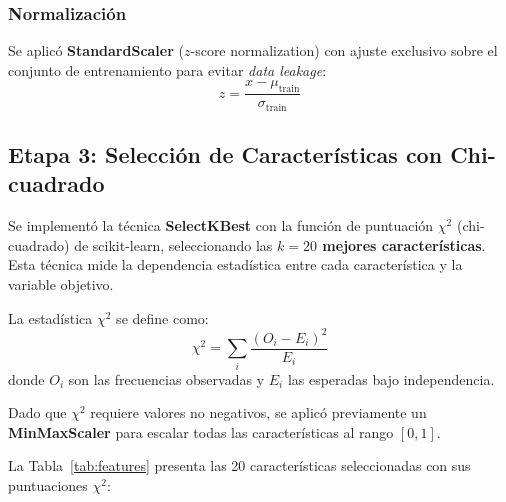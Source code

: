 \documentclass[12pt,a4paper]{article}
\begin{document}
\subsubsection{Normalización}
Se aplicó \textbf{StandardScaler} ($z$-score normalization) con ajuste exclusivo sobre el
conjunto de entrenamiento para evitar \textit{data leakage}:
\begin{equation}
    z = \frac{x - \mu_{\text{train}}}{\sigma_{\text{train}}}
\end{equation}

\subsection{Etapa 3: Selección de Características con Chi-cuadrado}

Se implementó la técnica \textbf{SelectKBest} con la función de puntuación $\chi^2$
(chi-cuadrado) de scikit-learn, seleccionando las \textbf{$k=20$ mejores características}.
Esta técnica mide la dependencia estadística entre cada característica y la variable objetivo.

La estadística $\chi^2$ se define como:
\begin{equation}
    \chi^2 = \sum_{i} \frac{(O_i - E_i)^2}{E_i}
\end{equation}
donde $O_i$ son las frecuencias observadas y $E_i$ las esperadas bajo independencia.

Dado que $\chi^2$ requiere valores no negativos, se aplicó previamente un
\textbf{MinMaxScaler} para escalar todas las características al rango $[0, 1]$.

La Tabla~\ref{tab:features} presenta las 20 características seleccionadas con sus puntuaciones $\chi^2$:
\end{document}

